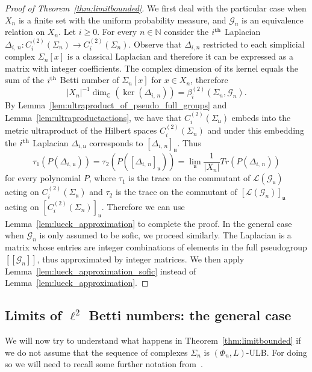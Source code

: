 \documentclass[AHL,Unicode,longabstracts,published]{cedram}
\newcommand{\Nmath}{\mathbb{N}}
\newcommand{\Cmath}{\mathbb{C}}
\newcommand{\LL}{\mathcal{L}}
\newcommand{\cg}{\mathcal{G}}
\newcommand{\ul}{\mathfrak{u}}
\begin{document}
\begin{proof}[Proof of Theorem~\ref{thm:limitbounded}]
We first deal with the particular case when $X_n$ is a finite set with the uniform probability measure, and $\cg_n$ is an equivalence relation on $X_n$. Let $i \geq 0$. For every $n\in\Nmath$ consider the $i^{\rm th}$ Laplacian $\Delta_{i,\,n}: C_{i}^{(2)}(\Sigma_n)\rightarrow C_{i}^{(2)}(\Sigma_n)$. Observe that $\Delta_{i,n}$ restricted to each simplicial complex $\Sigma_n[x]$ is a classical Laplacian and therefore it can be expressed as a matrix with integer coefficients. The complex dimension of its kernel equals the sum of the $i^{\rm th}$ Betti number of $\Sigma_n[x]$ for $x\in X_n$, therefore
\[
|X_n|^{-1}\dim_{\Cmath}\left(\ker\left(\Delta_{i,\,n}\right)\right)=\beta^{(2)}_i\left(\Sigma_n,\cg_n\right).
\]
By Lemma~\ref{lem:ultraproduct_of_pseudo_full_groups} and Lemma~\ref{lem:ultraproductactions}, we have that $C_{i}^{(2)}(\Sigma_\ul)$ embeds into the metric ultraproduct of the Hilbert spaces $C_{i}^{(2)}(\Sigma_n)$ and under this embedding the $i^{\rm th}$ Laplacian $\Delta_{i,\ul}$ corresponds to $[\Delta_{i,\,n}]_\ul$. Thus
\[
\tau_1\left(P\left(\Delta_{i,\,\ul}\right)\right)= \tau_2\left(P\left([\Delta_{i,\,n}]_\ul\right)\right)= \lim_\ul \frac 1 {\vert X_n\vert} Tr\left(P\left(\Delta_{i,\,n}\right)\right)
\]
for every polynomial $P$, where $\tau_1$ is the trace on the commutant of $\LL(\cg_\ul)$ acting on $C_{i}^{(2)}(\Sigma_\ul)$ and $\tau_2$ is the trace on the commutant of $[\LL(\cg_n)]_\ul$ acting on $[C_{i}^{(2)}(\Sigma_n)]_\ul$. Therefore we can use Lemma~\ref{lem:lueck_approximation} to complete the proof. In the general case when $\cg_n$ is only assumed to be sofic, we proceed similarly. The Laplacian is a matrix whose entries are integer combinations of elements in the full pseudogroup $[[\cg_n]]$, thus approximated by integer matrices. We then apply Lemma~\ref{lem:lueck_approximation_sofic} instead of Lemma~\ref{lem:lueck_approximation}.
\end{proof}

\subsection{\texorpdfstring{Limits of $\ell^2$ Betti numbers: the general case}{Limits of L2 Betti numbers: the general case}}

We will now try to understand what happens in Theorem~\ref{thm:limitbounded} if we do not assume that the sequence of complexes $\Sigma_n$ is $(\Phi_n,L)$-ULB. For doing so we will need to recall some further notation from~\cite{gab_ihes}.
\end{document}
